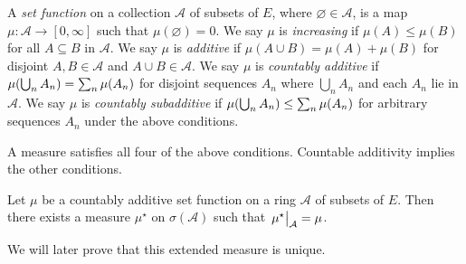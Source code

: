 \begin{definition}
	A \emph{set function} on a collection \( \mathcal A \) of subsets of \( E \), where \( \varnothing \in \mathcal A \), is a map \( \mu \colon \mathcal A \to [0,\infty] \) such that \( \mu(\varnothing) = 0 \).
	We say \( \mu \) is \emph{increasing} if \( \mu(A) \leq \mu(B) \) for all \( A \subseteq B \) in \( \mathcal A \).
	We say \( \mu \) is \emph{additive} if \( \mu(A \cup B) = \mu(A) + \mu(B) \) for disjoint \( A, B \in \mathcal A \) and \( A \cup B \in \mathcal A \).
	We say \( \mu \) is \emph{countably additive} if \( \mu\qty(\bigcup_n A_n) = \sum_n \mu(A_n) \) for disjoint sequences \( A_n \) where \( \bigcup_n A_n \) and each \( A_n \) lie in \( \mathcal A \).
	We say \( \mu \) is \emph{countably subadditive} if \( \mu\qty(\bigcup_n A_n) \leq \sum_n \mu(A_n) \) for arbitrary sequences \( A_n \) under the above conditions.
\end{definition}
\begin{remark}
	A measure satisfies all four of the above conditions. Countable additivity implies the other conditions.
\end{remark}
\begin{theorem}
	Let \( \mu \) be a countably additive set function on a ring \( \mathcal A \) of subsets of \( E \).
	Then there exists a measure \( \mu^\star \) on \( \sigma(\mathcal A) \) such that \( \eval{\mu^\star}_{\mathcal A} = \mu \).
\end{theorem}
We will later prove that this extended measure is unique.
